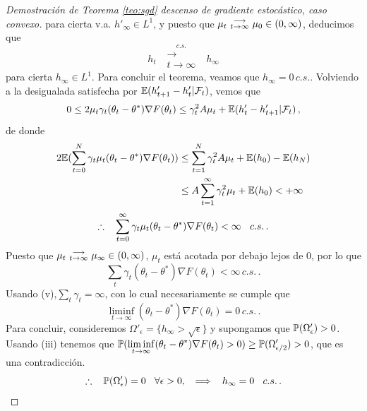 \begin{proof}[Demostración de Teorema \ref{teo:sgd} descenso de gradiente estocástico, caso convexo]
para cierta v.a. $ h'_\infty\in L^1$, 
y puesto que $\mu_t \convt \mu_0\in(0,\infty)$, deducimos que $$h_t\mbox{ }\overset{c.s.}{\substack{\longrightarrow \\t \to \infty}}\mbox{ }h_\infty$$ para cierta $h_\infty\in L^1$. 
Para concluir el teorema,  veamos que $h_\infty=0\,c.s.$.  Volviendo a la desigualada satisfecha por $\E(h'_{t+1}-h_t'|\mathcal{F}_t)$, vemos que 
$$ 0\leq 2\mu_t \gamma_t(\theta_t-\theta^*)\nabla F(\theta_t)\leq \gamma_t^2A\mu_t + \E(h'_t-h'_{t+1}|\mathcal{F}_t) \,,$$
de donde
\begin{alignat*}{2}
 2\E(\displaystyle\sum^N_{t=0}\gamma_t\mu_t(\theta_t-\theta^*)\nabla F(\theta_t)) & \leq \displaystyle\sum^N_{t=1}\gamma_t^2 A\mu_t+\E(h_0)-\E(h_{N}) \\
& \leq A\sum^{\infty}_{t=1}\gamma_t^2\mu_t+\E(h_0)<+\infty
\end{alignat*}
$$ \therefore \espacio \displaystyle\sum^\infty_{t=0}\gamma_t\mu_t(\theta_t-\theta^*)\nabla F(\theta_t)<\infty \espacio c.s.\,.$$
Puesto que $\mu_t\convt\mu_\infty\in(0,\infty)$, $\mu_t$ est\'a acotada por debajo lejos de $0$, por lo que 
$$  \displaystyle\sum_t\gamma_t(\theta_t-\theta^*)\nabla F(\theta_t)<\infty \, c.s.\,.$$
Usando (v),\espacio $\displaystyle\sum_t\gamma_t=\infty$, con lo cual necesariamente se cumple que 
$$ \displaystyle\liminf_{t\to\infty}(\theta_t-\theta^*)\nabla F(\theta_t) = 0 \,c.s.\,.$$
Para concluir, consideremos $\Omega'_\epsilon=\{h_\infty>\sqrt{\epsilon}\}$ y supongamos que $\P(\Omega'_\epsilon)>0$. Usando (iii) tenemos que $\P(\displaystyle\liminf_{t\to\infty}(\theta_t-\theta^*)\nabla F(\theta_t)>0)\geq \P(\Omega'_{\epsilon/2})  >0$, que es una contradicción. 
$$ \therefore\espacio \P(\Omega'_\epsilon)=0\espacio\forall\epsilon>0,\espacio \Longrightarrow\espacio h_\infty=0\espacio c.s.\,. $$ \findem
\negro
\end{proof}
\vspace{1cm}\\
